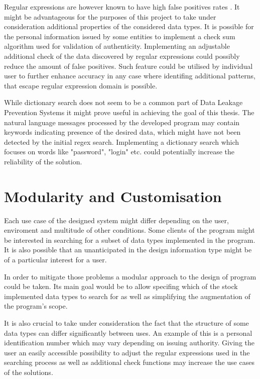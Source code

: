 \documentclass[a4paper,twoside,12pt]{book}
\begin{document}
Regular expressions are however known to have high false positives rates \cite{bib:articleDLPS}. It might be advantageous for the purposes of this project 
to take under consideration additional properties of the considered data types. It is possible for the personal information issued
by some entities to implement a check sum algorithm used for validation of authenticity. Implementing an adjustable additional check 
of the data discovered by regular expressions could possibly reduce the amount of false positives. Such feature could be utilised by 
individual user to further enhance accuracy in any case where identifing additional patterns, that escape regular expression domain is possible.

While dictionary search does not seem to be a common part of Data Leakage Prevention Systems it might prove useful in achieving the goal of this thesis.
The natural language messages processed by the developed program may contain keywords indicating presence of the desired data, which might have not been 
detected by the initial regex search. Implementing a dictionary search which focuses on words like "password", "login" etc. could potentially increase the
reliability of the solution. 

\section{Modularity and Customisation}

Each use case of the designed system might differ depending on the user, enviroment and multitude of other conditions. 
Some clients of the program might be interested in searching for a subset of data types implemented in the program. It is
also possible that an unanticipated in the design information type might be of a particular interest for a user. 

In order to mitigate those problems a modular approach to the design of program could be taken. Its main goal would be to allow specifing
which of the stock implemented data types to search for as well as simplifying the augmentation of the program's scope.

It is also crucial to take under consideration the fact that the structure of some data types can differ significantly between uses.
An example of this is a personal identification number which may vary depending on issuing authority. Giving the user an easily accessible possibility to 
adjust the regular expressions used in the searching process as well as additional check functions may increase the use cases of the solutions.
\end{document}
